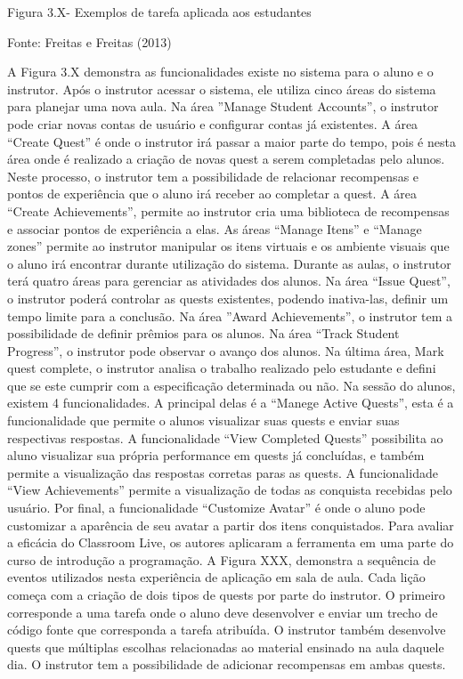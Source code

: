 \documentclass[
	12pt,				%
	oneside,			%
	a4paper,			%
	english,			%
	french,				%
	spanish,			%
	brazil,				%
	]{abntex2}
\begin{document}
Figura 3.X- Exemplos de tarefa aplicada aos estudantes

Fonte: Freitas e Freitas (2013)

A Figura 3.X demonstra as funcionalidades existe no sistema para o aluno e o instrutor.
Após o instrutor acessar o sistema, ele utiliza cinco áreas do sistema para planejar uma nova aula. Na área ”Manage Student Accounts”, o instrutor pode criar novas contas de usuário e configurar contas já existentes. A área “Create Quest” é onde o instrutor irá passar a maior parte do tempo, pois é nesta área onde é realizado a criação de novas quest a serem completadas pelo alunos. Neste processo, o instrutor tem a possibilidade de relacionar recompensas e pontos de experiência que o aluno irá receber ao completar a quest. 
A área “Create Achievements”, permite ao instrutor cria uma biblioteca de recompensas e associar pontos de experiência a elas. As áreas “Manage Itens” e “Manage zones” permite ao instrutor manipular os itens virtuais e os ambiente visuais que o aluno irá encontrar durante utilização do sistema.
Durante as aulas, o instrutor terá quatro áreas para gerenciar as atividades dos alunos. Na área “Issue Quest”, o instrutor poderá controlar as quests existentes, podendo inativa-las, definir um tempo limite para a conclusão. Na área ”Award Achievements”, o instrutor tem a possibilidade de definir prêmios para os alunos. Na área “Track Student Progress”, o instrutor pode observar o avanço dos alunos. Na última área, Mark quest complete, o instrutor analisa o trabalho realizado pelo estudante e defini que se este cumprir com a especificação determinada ou não.
Na sessão do alunos, existem 4 funcionalidades. A principal delas é a “Manege Active Quests”, esta é a funcionalidade que permite o alunos visualizar suas quests e enviar suas respectivas respostas. A funcionalidade “View Completed Quests” possibilita ao aluno visualizar sua própria performance em quests já concluídas, e também permite a visualização das respostas corretas paras as quests. A funcionalidade “View Achievements” permite a visualização de todas as conquista recebidas pelo usuário. Por final, a funcionalidade “Customize Avatar” é onde o aluno pode customizar a aparência de seu avatar a partir dos itens conquistados.
Para avaliar a eficácia do Classroom Live, os autores aplicaram a ferramenta em uma parte do curso de introdução a programação. A Figura XXX, demonstra a sequência de eventos utilizados nesta experiência de aplicação em sala de aula. Cada lição começa com a criação de dois tipos de quests por parte do instrutor. O primeiro corresponde a uma tarefa onde o aluno deve desenvolver e enviar um trecho de código fonte que corresponda a tarefa atribuída. O instrutor também desenvolve quests que múltiplas escolhas relacionadas ao material ensinado na aula daquele dia. O instrutor tem a possibilidade de adicionar recompensas em ambas quests.
\end{document}

